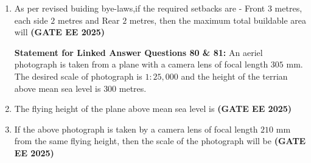 \documentclass[journal,12pt,onecolumn]{IEEEtran}
\theoremstyle{remark}
\begin{document}
\begin{enumerate}
\begin{enumerate}
\end{enumerate}
\item As per revised buiding bye-laws,if the required setbacks are - Front $3$ metres, each side $2$ metres and Rear $2$ metres, then the maximum total buildable area will \hfill\textbf{(GATE EE 2025)}
\begin{enumerate}
\end{enumerate}
\textbf{Statement for Linked Answer Questions 80 \& 81:}
\newline
An aeriel photograph is taken from a plane with a camera lens of focal length $305$ mm. The desired scale of photograph is $1:25,000$ and the height of the terrian above mean sea level is $300$ metres.
\newline
\item The flying height of the plane above mean sea level is \hfill\textbf{(GATE EE 2025)}
\begin{enumerate}
\end{enumerate}
\item If the above photograph is taken by a camera lens of focal length $210$ mm from the same flying height, then the scale of the photograph will be \hfill\textbf{(GATE EE 2025)}
\begin{enumerate}
\end{enumerate}
  

\end{enumerate}
\end{document}
